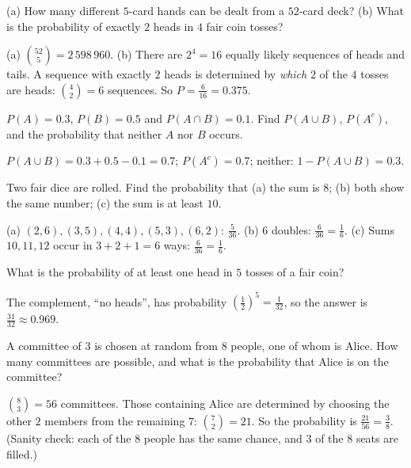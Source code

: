 \begin{example}\label{ex:combinations}
(a) How many different $5$-card hands can be dealt from a $52$-card deck?
(b) What is the probability of exactly $2$ heads in $4$ fair coin tosses?

\sol (a) $\binom{52}{5} = 2\,598\,960$. (b) There are $2^4 = 16$ equally likely
sequences of heads and tails. A sequence with exactly $2$ heads is determined by
\emph{which} $2$ of the $4$ tosses are heads: $\binom42 = 6$ sequences. So
$P = \frac{6}{16} = 0.375$.
\end{example}

\sectionexercises

\begin{exercise}
$P(A) = 0.3$, $P(B) = 0.5$ and $P(A \cap B) = 0.1$. Find $P(A \cup B)$,
$P(A^c)$, and the probability that neither $A$ nor $B$ occurs.
\end{exercise}
\begin{solution}
$P(A \cup B) = 0.3 + 0.5 - 0.1 = 0.7$; $P(A^c) = 0.7$; neither:
$1 - P(A \cup B) = 0.3$.
\end{solution}

\begin{exercise}
Two fair dice are rolled. Find the probability that (a) the sum is $8$;
(b) both show the same number; (c) the sum is at least $10$.
\end{exercise}
\begin{solution}
(a) $(2,6), (3,5), (4,4), (5,3), (6,2)$: $\tfrac{5}{36}$. (b) $6$ doubles:
$\tfrac{6}{36} = \tfrac16$. (c) Sums $10, 11, 12$ occur in $3 + 2 + 1 = 6$ ways:
$\tfrac{6}{36} = \tfrac16$.
\end{solution}

\begin{exercise}
What is the probability of at least one head in $5$ tosses of a fair coin?
\end{exercise}
\begin{solution}
The complement, ``no heads'', has probability $\left(\tfrac12\right)^5 =
\tfrac{1}{32}$, so the answer is $\tfrac{31}{32} \approx 0.969$.
\end{solution}

\begin{exercise}
A committee of $3$ is chosen at random from $8$ people, one of whom is Alice.
How many committees are possible, and what is the probability that Alice is on
the committee?
\end{exercise}
\begin{solution}
$\binom83 = 56$ committees. Those containing Alice are determined by choosing
the other $2$ members from the remaining $7$: $\binom72 = 21$. So the probability
is $\tfrac{21}{56} = \tfrac38$. (Sanity check: each of the $8$ people has the same
chance, and $3$ of the $8$ seats are filled.)
\end{solution}

